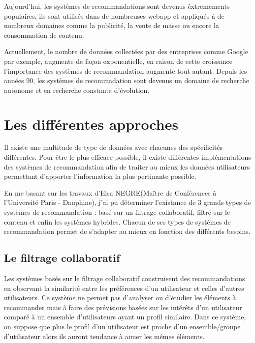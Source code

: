 Aujourd'hui, les systèmes de recommandations sont devenus êxtremements populaires, ils sont utilisés dans de nombreuses webapp et appliqués à de nombreux domaines comme la publicité, la vente de masse ou encore la consommation de contenu.

\vspace{5mm}

Actuellement, le nombre de données collectées par des entreprises comme Google par exemple, augmente de façon exponentielle, en raison de cette croissance l'importance des systèmes de recommandation augmente tout autant. Depuis les années 90, les systèmes de recommadation sont devenus un domaine de recherche autonome et en recherche constante d'évolution\supercite{ieee}.




\section{Les différentes approches}



Il existe une multitude de type de données avec chacunes des spécificités différentes. Pour être le plus efficace possible, il existe différentes implémentations des systèmes de recommandation afin de traiter au mieux les données utilisateurs permettant d'apporter l'information la plus pertinante possible.

\vspace{5mm} 

En me basant sur les travaux d'Elsa NEGRE\supercite{elsaNegre}(Maître de Conférences à l'Université Paris - Dauphine), j'ai pu déterminer l'existance de 3 grands types de systèmes de recommandation : basé sur un filtrage collaboratif, filtré sur le contenu et enfin les systèmes hybrides. Chacun de ses types de systèmes de recommandation permet de s'adapter au mieux en fonction des différents besoins.


\subsection{Le filtrage collaboratif}

Les systèmes basés sur le filtrage collaboratif construisent des recommandations en observant  la similarité entre les préférences d’un utilisateur et celles d’autres utilisateurs. Ce système ne permet pas d'analyser ou d'étudier les éléments à recommander mais à faire des prévisions basées sur les intérêts d'un utilisateur comparé à un ensemble d'utilisateurs ayant un profil similaire. Dans ce système, on suppose que plus le profil d'un utilisateur est proche d'un ensemble/groupe d'utilisateur alors ils auront tendance à aimer les mêmes éléments. 

